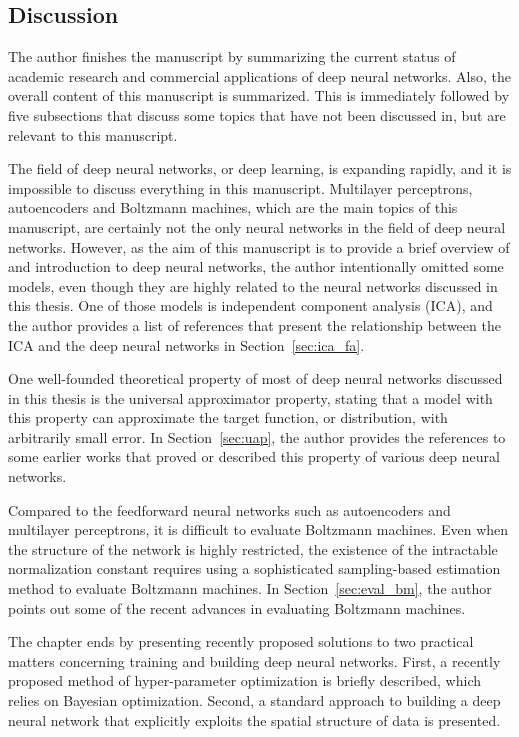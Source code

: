 \documentclass{now}
\begin{document}
\subsection{Discussion}

The author finishes the manuscript by summarizing the current status of
academic research and commercial applications of deep neural networks. Also,
the overall content of this manuscript is summarized.  
This is immediately followed by five subsections that discuss some topics that
have not been discussed in, but are relevant to this manuscript.

The field of deep neural networks, or deep learning, is expanding rapidly, and
it is impossible to discuss everything in this manuscript. Multilayer
perceptrons, autoencoders and  Boltzmann machines, which are the main topics of
this manuscript, are certainly not the only neural networks in the field of
deep neural networks. However, as the aim of this manuscript is to provide a
brief overview of and introduction to deep neural networks, the author
intentionally omitted some models, even though they are highly related to the
neural networks discussed in this thesis. One of those models is independent
component analysis (ICA), and
the author provides a list of references that present the relationship between
the ICA and the deep neural networks in Section~\ref{sec:ica_fa}.

One well-founded theoretical property of most of deep neural networks discussed
in this thesis is the universal approximator property, stating that a model
with this property can approximate the target function, or distribution, with
arbitrarily small error. In Section~\ref{sec:uap}, the author provides the
references to some earlier works that proved or described this property of
various deep neural networks.

Compared to the feedforward neural networks such as autoencoders and multilayer
perceptrons, it is difficult to evaluate Boltzmann machines. Even when the
structure of the network is highly restricted, the existence of the intractable
normalization constant requires using a sophisticated sampling-based estimation
method to evaluate Boltzmann machines. In Section~\ref{sec:eval_bm}, the author
points out some of the recent advances in evaluating Boltzmann machines.

The chapter ends by presenting recently proposed solutions to two practical
matters concerning training and building deep neural networks. First, a
recently proposed method of hyper-parameter optimization is briefly described,
which relies on Bayesian optimization. Second, a standard approach to building
a deep neural network that explicitly exploits the spatial structure of data is
presented.
\end{document}
